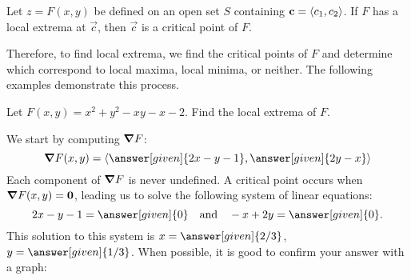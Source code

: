 \documentclass{ximera}
\begin{document}
\begin{theorem}
Let $z=F(x,y)$ be defined on an open set $S$ containing
$\mathbf{c}=\left\langle c_1,c_2\right\rangle$. If $F$ has a local extrema at $\vec{c}$, then $\vec{c}$ is a
critical point of $F$.
\end{theorem}

Therefore, to find local extrema, we find the critical points of
$F$ and determine which correspond to local maxima, local
minima, or neither. The following examples demonstrate this process.

\begin{example}
  Let $F(x,y) = x^2+y^2-xy-x-2$. Find the local extrema of $F$.
  \begin{explanation}
    We start by computing $\boldsymbol\nabla F$:
    \[
    \grad F(x,y) = \vector{\answer[given]{2x-y-1},\answer[given]{2y-x}}
    \]
    Each component of $\boldsymbol\nabla F$ is never undefined. A critical point
    occurs when $\boldsymbol\nabla F(x,y) = \mathbf{0}$, leading us to solve the
    following system of linear equations:
    \[
    2x-y-1 =\answer[given]{0}\quad \text{and}\quad -x+2y = \answer[given]{0}.
    \]
    This solution to this system is $x=\answer[given]{2/3}$,
    $y=\answer[given]{1/3}$. When possible, it is good to confirm your answer with a graph:
    \begin{image}
\end{image}
\end{explanation}
\end{example}
\end{document}
